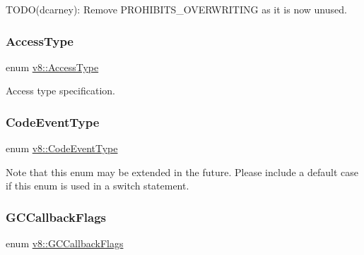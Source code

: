 T\+O\+D\+O(dcarney)\+: Remove P\+R\+O\+H\+I\+B\+I\+T\+S\+\_\+\+O\+V\+E\+R\+W\+R\+I\+T\+I\+NG as it is now unused. \mbox{\label{namespacev8_add8bef6469c5b94706584124e610046c}} 
\subsubsection{\texorpdfstring{Access\+Type}{AccessType}}
{\footnotesize\ttfamily enum \mbox{\hyperlink{namespacev8_add8bef6469c5b94706584124e610046c}{v8\+::\+Access\+Type}}}

Access type specification. \mbox{\label{namespacev8_af0ff31131cc32ced9b5279b321569bbc}} 
\subsubsection{\texorpdfstring{Code\+Event\+Type}{CodeEventType}}
{\footnotesize\ttfamily enum \mbox{\hyperlink{namespacev8_af0ff31131cc32ced9b5279b321569bbc}{v8\+::\+Code\+Event\+Type}}}

Note that this enum may be extended in the future. Please include a default case if this enum is used in a switch statement. \mbox{\label{namespacev8_a247c37a849f4d6c293b9b16e94e1944b}} 
\subsubsection{\texorpdfstring{G\+C\+Callback\+Flags}{GCCallbackFlags}}
{\footnotesize\ttfamily enum \mbox{\hyperlink{namespacev8_a247c37a849f4d6c293b9b16e94e1944b}{v8\+::\+G\+C\+Callback\+Flags}}}

